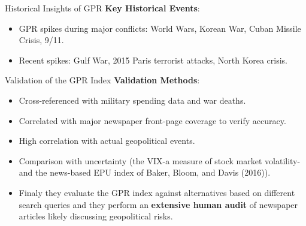 \documentclass[11pt]{beamer}
\begin{document}
\begin{frame}{Historical Insights of GPR}
\textbf{Key Historical Events}:

	\begin{itemize}
		\item GPR spikes during major conflicts: World Wars, Korean War, Cuban Missile Crisis, 9/11.

		\item Recent spikes: Gulf War, 2015 Paris terrorist attacks, North Korea crisis.
	\end{itemize}
\end{frame}
\begin{frame}{Validation of the GPR Index}
\textbf{Validation Methods}:

	\begin{itemize}
		\item Cross-referenced with military spending data and war deaths.

		\item Correlated with major newspaper front-page coverage to verify accuracy.

		\item High correlation with actual geopolitical events.

		\item Comparison with uncertainty (the VIX-a measure of stock market volatility-and the news-based EPU index of Baker, Bloom, and Davis (2016)).

		\item Finaly they evaluate the GPR index against alternatives based on different search queries and they perform an \textbf{extensive human audit} of newspaper articles likely discussing geopolitical risks.
	\end{itemize}
\end{frame}
\end{document}
